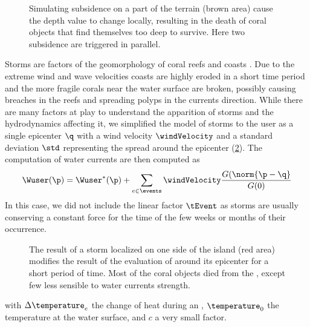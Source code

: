\begin{figure}
    \caption{Simulating subsidence on a part of the terrain (brown area) cause the depth value to change locally, resulting in the death of coral objects that find themselves too deep to survive. Here two subsidence  are triggered in parallel. }
    \label{fig:env-obj_subsidence-event}
\end{figure}

Storms are factors of the geomorphology of coral reefs \cite{VilaConcejo2016, Oron2023} and coasts \cite{Dominguez2005, Cowart2010}. Due to the extreme wind and wave velocities coasts are highly eroded in a short time period and the more fragile corals near the water surface are broken, possibly causing breaches in the reefs and spreading polyps in the currents direction. While there are many factors at play to understand the apparition of storms and the hydrodynamics affecting it, we simplified the model of storms to the user as a single epicenter $\q$ with a wind velocity $\windVelocity$ and a standard deviation $\std$ representing the spread around the epicenter (\cref{fig:env-obj_storm-event}). The computation of water currents are then computed as 
\begin{align*}
    \Wuser(\p) = \Wuser^*(\p) + \sum_{e \in \events} {\windVelocity \frac{G(\norm{\p - \q}}{G(0)}}
\end{align*}
In this case, we did not include the linear factor $\tEvent$ as storms are usually conserving a constant force for the time of the few weeks or months of their occurrence. 

\begin{figure}
    \caption{The result of a storm localized on one side of the island (red area) modifies the result of the evaluation of  around its epicenter for a short period of time. Most of the coral objects died from the , except few  less sensible to water currents strength. }
    \label{fig:env-obj_storm-event}
\end{figure}

with $\Delta \temperature_e$ the change of heat during an , $\temperature_0$ the temperature at the water surface, and $c$ a very small factor.

